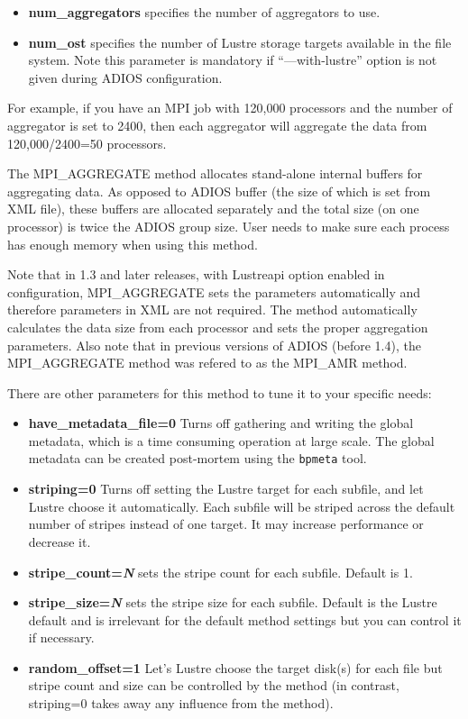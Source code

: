 \begin{itemize}
\item \textbf{num\_aggregators} specifies the number of aggregators 
to use.
\item \textbf{num\_ost }specifies the number of Lustre storage targets 
 available in the file system. Note this parameter is mandatory if ``---with-lustre'' 
option is not given during ADIOS configuration.
\end{itemize}

For example, if you have an MPI job with 120,000 processors and the number of aggregator 
is set to 2400, then each aggregator will aggregate the data from 120,000/2400=50 
processors.

The MPI\_AGGREGATE method allocates stand-alone internal buffers for aggregating data. 
As opposed to ADIOS buffer (the size of which is set from XML file), these buffers 
are allocated separately and the total size (on one processor) is twice the ADIOS 
group size. User needs to make sure each process has enough memory when using this 
method.  

Note that in 1.3 and later releases, with Lustreapi option enabled in configuration, 
MPI\_AGGREGATE sets the parameters automatically and therefore parameters in XML are 
not required. The method automatically calculates the data size from each processor 
and sets the proper aggregation parameters. Also note that in previous versions
of ADIOS (before 1.4), the MPI\_AGGREGATE method was refered to as the MPI\_AMR
method. 

There are other parameters for this method to tune it to your specific needs:

\begin{itemize}
\item \textbf{have\_metadata\_file=0} Turns off gathering and writing the global metadata, which is a time consuming operation at large scale. The global metadata can be created post-mortem using the \verb+bpmeta+ tool.
\item \textbf{striping=0} Turns off setting the Lustre target for each subfile, and let Lustre choose it automatically. Each subfile will be striped across the default number of stripes instead of one target. It may increase performance or decrease it.
\item \textbf{stripe\_count={\em N}} sets the stripe count for each subfile. Default is 1.
\item \textbf{stripe\_size={\em N}} sets the stripe size for each subfile. Default is the Lustre default and is irrelevant for the default method settings but you can control it if necessary.
\item \textbf{random\_offset=1} Let's Lustre choose the target disk(s) for each file but stripe count and size can be controlled by the method (in contrast, striping=0 takes away any influence from the method).
\end{itemize}


